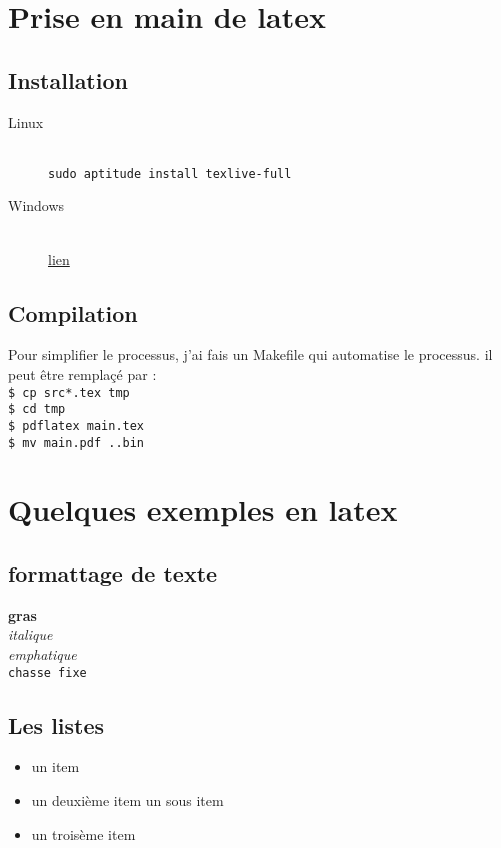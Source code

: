 \section{Prise en main de latex}
\subsection{Installation}
	\begin{description}
		\item[Linux]~\\
			\texttt{sudo aptitude install texlive-full}
		\item[Windows]~\\
			\href{http://mirror.ctan.org/systems/texlive/tlnet/install-tl.zip}{lien}
	\end{description}

\subsection{Compilation}
	Pour simplifier le processus, j'ai fais un Makefile qui automatise le processus.
	il peut être remplaçé par :\\
		\texttt{\$ cp src\/*.tex tmp\/}\\
		\texttt{\$ cd tmp\/}\\		
		\texttt{\$ pdflatex main.tex}\\
		\texttt{\$ mv main.pdf ..\/bin\/}\\

\section{Quelques exemples en latex}
\subsection{formattage de texte}

	\textbf{gras}\\
	\textit{italique}\\
	\emph{emphatique}\\
	\texttt{chasse fixe}\\

\subsection{Les listes}
		
	\begin{itemize}
	\item un item
	\item un deuxième item
		\subitem un sous item
	\item un troisème item
	\end{itemize}
